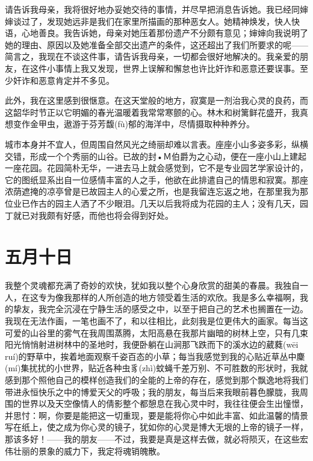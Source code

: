 \documentclass[12pt,oneside]{book}
\begin{document}
请告诉我母亲，我将很好地办妥她交待的事情，并尽早把消息告诉她。我已经同婶婶谈过了，发现她远非是我们在家里所描画的那种恶女人。她精神焕发，快人快语，心地善良。我告诉她，母亲对她压着那份遗产不分颇有意见；婶婶向我说明了她的理由、原因以及她准备全部交出遗产的条件，这还超出了我们所要求的呢——简言之，我现在不谈这件事，请告诉我母亲，一切都会很好地解决的。我亲爱的朋友，在这件小事情上我又发现，世界上误解和懈怠也许比奸诈和恶意还要误事。至少奸诈和恶意肯定并不多见。

此外，我在这里感到很惬意。在这天堂般的地方，寂寞是一剂治我心灵的良药，而这韶华时节正以它明媚的春光温暖着我常常寒颤的心。林木和树篱鲜花盛开，我真想变作金甲虫，遨游于芬芳馥(fù)郁的海洋中，尽情摄取种种养分。

城市本身并不宜人，但周围自然风光之绮丽却难以言表。座座小山多姿多彩，纵横交错，形成一个个秀丽的山谷。已故的封•Ｍ伯爵为之心动，便在一座小山上建起一座花园。花园简朴无华，一进去马上就会感觉到，它不是专业园艺学家设计的，它的图纸显系出自一位感情丰富的人之手，他欲在此排遣自己的情思和寂寞。那座浓荫遮掩的凉亭曾是已故园主人的心爱之所，也是我留连忘返之地，在那里我为那位业已作古的园主人洒了不少眼泪。几天以后我将成为花园的主人；没有几天，园丁就已对我颇有好感，而他也将会得到好处。





\chapter{五月十日}
我整个灵魂都充满了奇妙的欢快，犹如我以整个心身欣赏的甜美的春晨。我独自一人，在这专为像我那样的人所创造的地方领受着生活的欢欣。我是多么幸福啊，我的挚友，我完全沉浸在宁静生活的感受之中，以至于把自己的艺术也搁置在一边。我现在无法作画，一笔也画不了，和以往相比，此刻我是位更伟大的画家。每当这可爱的山谷里的雾气在我周围蒸腾，太阳高悬在我那片幽暗的树林上空，只有几束阳光悄悄射进树林中的圣地时，我便卧躺在山涧那飞跌而下的溪水边的葳蕤(wēi ruí)的野草中，挨着地面观察千姿百态的小草；每当我感觉到我的心贴近草丛中麇(mí)集扰扰的小世界，贴近各种虫豸(zhì)蚊蝇千差万别、不可胜数的形状时，我就感到那个照他自己的模样创造我们的全能的上帝的存在，感觉到那个飘逸地将我们带进永恒快乐之中的博爱天父的呼吸；我的朋友，每当后来我眼前暮色朦胧，我周围的世界以及天空像情人的倩影整个都憩息在我心灵中时，我往往便会生出憧憬，并思忖：啊，你要是能把这一切重现，要是能将你心中如此丰富、如此温馨的情景写在纸上，使之成为你心灵的镜子，犹如你的心灵是博大无垠的上帝的镜子一样，那该多好！——我的朋友——不过，我要是真是这样去做，就必将陨灭，在这些宏伟壮丽的景象的威力下，我定将魂销魄散。
\end{document}
